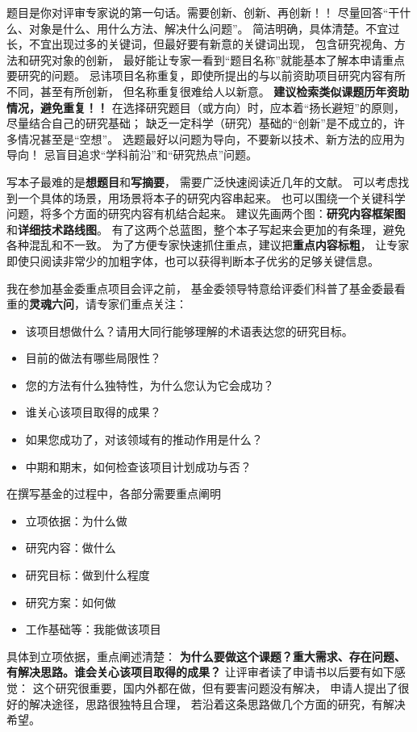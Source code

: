\documentclass[12pt]{article}
\newcommand{\myEmph}[1]{\textbf{\textcolor[rgb]{0,0,0.25}{#1}}}
\begin{document}
题目是你对评审专家说的第一句话。需要创新、创新、再创新！！
尽量回答“干什么、对象是什么、用什么方法、解决什么问题”。
简洁明确，具体清楚。不宜过长，不宜出现过多的关键词，但最好要有新意的关键词出现，
包含研究视角、方法和研究对象的创新，
最好能让专家一看到“题目名称”就能基本了解本申请重点要研究的问题。 
忌讳项目名称重复，即使所提出的与以前资助项目研究内容有所不同，甚至有所创新，
但名称重复很难给人以新意。
\myEmph{建议检索类似课题历年资助情况，避免重复！！}
%
在选择研究题目（或方向）时，应本着“扬长避短”的原则，尽量结合自己的研究基础；
缺乏一定科学（研究）基础的“创新”是不成立的，许多情况甚至是“空想”。
选题最好以问题为导向，不要新以技术、新方法的应用为导向！
忌盲目追求“学科前沿”和“研究热点”问题。


写本子最难的是\myEmph{想题目}和\myEmph{写摘要}，
需要广泛快速阅读近几年的文献。
可以考虑找到一个具体的场景，用场景将本子的研究内容串起来。
也可以围绕一个关键科学问题，将多个方面的研究内容有机结合起来。
建议先画两个图：\myEmph{研究内容框架图}和\myEmph{详细技术路线图}。
有了这两个总蓝图，整个本子写起来会更加的有条理，避免各种混乱和不一致。
%
为了方便专家快速抓住重点，建议把\myEmph{重点内容标粗}，
让专家即使只阅读非常少的加粗字体，也可以获得判断本子优劣的足够关键信息。


我在参加基金委重点项目会评之前，
基金委领导特意给评委们科普了基金委最看重的\myEmph{灵魂六问}，请专家们重点关注：
\begin{itemize}
    \item 该项目想做什么？请用大同行能够理解的术语表达您的研究目标。
    \item 目前的做法有哪些局限性？
    \item 您的方法有什么独特性，为什么您认为它会成功？
    \item 谁关心该项目取得的成果？
    \item 如果您成功了，对该领域有的推动作用是什么？
    \item 中期和期末，如何检查该项目计划成功与否？
\end{itemize}

在撰写基金的过程中，各部分需要重点阐明
\begin{itemize}
    \item 立项依据：为什么做
    \item 研究内容：做什么
    \item 研究目标：做到什么程度
    \item 研究方案：如何做
    \item 工作基础等：我能做该项目
\end{itemize}


具体到立项依据，重点阐述清楚：
\myEmph{为什么要做这个课题？重大需求、存在问题、有解决思路。谁会关心该项目取得的成果？}
让评审者读了申请书以后要有如下感觉：
这个研究很重要，国内外都在做，但有要害问题没有解决，
申请人提出了很好的解决途径，思路很独特且合理，
若沿着这条思路做几个方面的研究，有解决希望。
\end{document}
